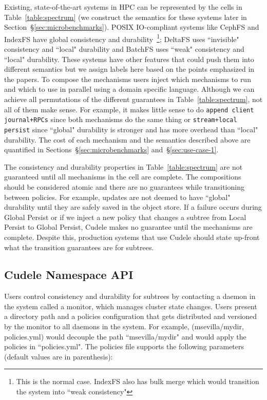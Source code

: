 Existing, state-of-the-art systems in HPC can be represented by the cells in
Table~\ref{table:spectrum} (we construct the semantics for these systems later
in Section~\S\ref{sec:microbenchmarks}).  POSIX IO-compliant systems like
CephFS and IndexFS have global consistency and durability~\footnote{This is the
normal case.  IndexFS also has bulk merge which would transition the system
into ``weak consistency"}; DeltaFS uses ``invisible" consistency and ``local"
durability and BatchFS uses ``weak" consistency and ``local" durability. These
systems have other features that could push them into different semantics but
we assign labels here based on the points emphasized in the papers.  To compose
the mechanisms users inject which mechanisms to run and which to use in
parallel using a domain specific language.  Although we can achieve all
permutations of the different guarantees in Table~\ref{table:spectrum}, not all
of them make sense. For example, it makes little sense to do \texttt{append
client journal+RPCs} since both mechanisms do the same thing or
\texttt{stream+local persist} since ``global" durability is stronger and has more
overhead than ``local" durability. The cost of each mechanism and the semantics
described above are quantified in Sections~\S\ref{sec:microbenchmarks}
and~\S\ref{sec:use-case-1}.

The consistency and durability properties in Table~\ref{table:spectrum} are not
guaranteed until all mechanisms in the cell are complete. The compositions
should be considered atomic and there are no guarantees while transitioning
between policies. For example, updates are not deemed to have ``global"
durability until they are safely saved in the object store. If a failure occurs
during Global Persist or if we inject a new policy that changes a subtree from
Local Persist to Global Persist, Cudele makes no guarantee until the mechanisms
are complete. Despite this, production systems that use Cudele should state
up-front what the transition guarantees are for subtrees.

\subsection{Cudele Namespace API}
\label{sec:cudelefs-namespace-api}

Users control consistency and durability for subtrees by contacting a daemon in
the system called a monitor, which manages cluster state changes.  Users
present a directory path and a policies configuration that gets distributed and
versioned by the monitor to all daemons in the system. For example,
(msevilla/mydir, policies.yml) would decouple the path ``msevilla/mydir" and
would apply the policies in ``policies.yml".  The policies file supports the
following parameters (default values are in parenthesis):

